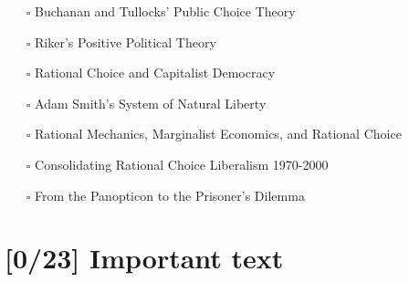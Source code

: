 \documentclass[paper=B6,portrait,twoside=true,twocolumn=false,headinclude=true,footinclude=false,fontsize=12,BCOR=10mm,DIV=calc,pagesize=auto,titlepage=firstiscover,mpinclude=false,headings=normal,headings=twolinechapter,open=right,toc=graduated,chapterprefix=false,numbers=endperiod,parskip=half+]{scrbook}
\theoremstyle{definition}
\begin{document}
\begin{enumerate}
\begin{itemize}
\item[{$\square$}] Buchanan and Tullocks' Public Choice Theory
\item[{$\square$}] Riker's Positive Political Theory
\item[{$\square$}] Rational Choice and Capitalist Democracy
\item[{$\square$}] Adam Smith's System of Natural Liberty
\item[{$\square$}] Rational Mechanics, Marginalist Economics, and Rational Choice
\item[{$\square$}] Consolidating Rational Choice Liberalism 1970-2000
\item[{$\square$}] From the Panopticon to the Prisoner's Dilemma
\end{itemize}
\end{enumerate}
\section{[0/23] Important text}
\label{sec:orge455609}
\end{document}
